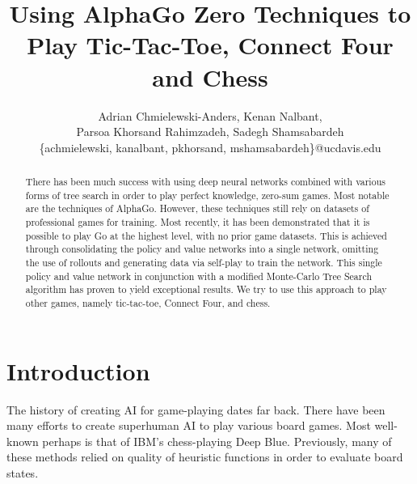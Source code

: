\documentclass[english]{article}
\begin{document}


\title{Using AlphaGo Zero Techniques to Play Tic-Tac-Toe, Connect Four and Chess}
\author{
Adrian Chmielewski-Anders, Kenan Nalbant, \\ Parsoa Khorsand Rahimzadeh, Sadegh Shamsabardeh \\
\{achmielewski, kanalbant, pkhorsand, mshamsabardeh\}@ucdavis.edu
}
\date{}

\maketitle


\begin{abstract}
There has been much success with using deep neural networks combined
with various forms of tree search in order to play perfect knowledge, zero-sum
games. Most notable are the techniques of AlphaGo. However,
these techniques still rely on datasets of professional games for training.
Most recently, it has been demonstrated that it is possible to play Go at
the highest level, with no prior game datasets.
This is achieved through consolidating the policy and value networks into a single
network, omitting the use of rollouts and generating data via self-play to train the
network. This single policy and value network
in conjunction with a modified Monte-Carlo Tree Search algorithm has proven to
yield exceptional results. We try to use this approach to play
other games, namely tic-tac-toe, Connect Four, and chess.

\end{abstract}
\section{Introduction}
The history of creating AI for game-playing dates far back. There have been many
efforts to create superhuman AI to play various board games. Most well-known
perhaps is that of IBM's chess-playing Deep Blue. Previously, many of these methods relied on
quality of heuristic functions in order to evaluate board states.
\end{document}
